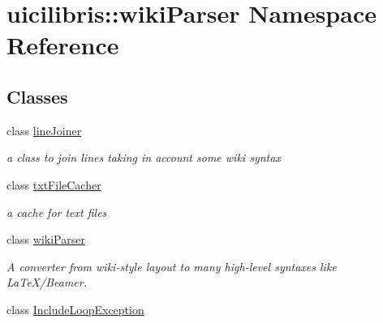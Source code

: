 \hypertarget{namespaceuicilibris_1_1wikiParser}{\section{uicilibris\-:\-:wiki\-Parser \-Namespace \-Reference}
\label{namespaceuicilibris_1_1wikiParser}
}
\subsection*{\-Classes}
\begin{DoxyCompactItemize}
\item 
class \hyperlink{classuicilibris_1_1wikiParser_1_1lineJoiner}{line\-Joiner}
\begin{DoxyCompactList}\small\item\em a class to join lines taking in account some wiki syntax \end{DoxyCompactList}\item 
class \hyperlink{classuicilibris_1_1wikiParser_1_1txtFileCacher}{txt\-File\-Cacher}
\begin{DoxyCompactList}\small\item\em a cache for text files \end{DoxyCompactList}\item 
class \hyperlink{classuicilibris_1_1wikiParser_1_1wikiParser}{wiki\-Parser}
\begin{DoxyCompactList}\small\item\em \-A converter from wiki-\/style layout to many high-\/level syntaxes like \-La\-Te\-X/\-Beamer. \end{DoxyCompactList}\item 
class \hyperlink{classuicilibris_1_1wikiParser_1_1IncludeLoopException}{\-Include\-Loop\-Exception}
\end{DoxyCompactItemize}
